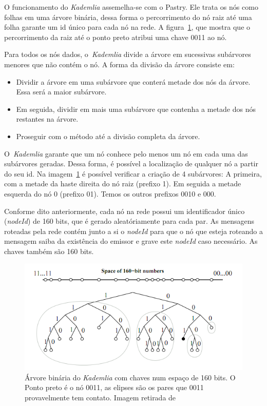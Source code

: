 O funcionamento do \emph{Kademlia} assemelha-se com o Pastry. Ele trata os nós como folhas em uma árvore binária, dessa forma o percorrimento do nó raiz até uma folha garante um id único para cada nó na rede. A figura~\ref{fig:arvore-kademlia}, que mostra que o percorrimento da raiz até o ponto preto atribui uma chave 0011 ao nó.

Para todos os nós dados, o~\emph{Kademlia} divide a árvore em sucessivas subárvores menores que não contém o nó. A forma da divisão da árvore consiste em:
\begin{itemize}
	\item Dividir a árvore em uma subárvore que conterá metade dos nós da árvore. Essa será a maior subárvore.
	\item Em seguida, dividir em mais uma subárvore que contenha a metade dos nós restantes na árvore.
	\item Proseguir com o método até a divisão completa da árvore.
\end{itemize}
O~\emph{Kademlia} garante que um nó conhece pelo menos um nó em cada uma das subárvores geradas. Dessa forma, é possível a localização de qualquer nó a partir do seu id. Na imagem~\ref{fig:arvore-kademlia} é possível verificar a criação de 4 subárvores: A primeira, com a metade da haste direita do nó raiz (prefixo 1). Em seguida a metade esquerda do nó 0 (prefixo 01). Temos os outros prefixos 0010 e 000.

Conforme dito anteriormente, cada nó na rede possui um identificador único (\emph{nodeId}) de 160 bits, que é gerado aleatóriamente para cada par. As mensagens roteadas pela rede contém junto a si o \emph{nodeId} para que o nó que esteja roteando a mensagem saiba da existência do emissor e grave este \emph{nodeId} caso necessário. As chaves também são 160 bits.

\begin{figure}
	\centering
	\includegraphics[scale=0.5]{images/arvore-kademlia.png}
	\caption{Árvore binária do \emph{Kademlia} com chaves num espaço de 160 bits. O Ponto preto é o nó 0011, as elipses são os pares que 0011 provavelmente tem contato. Imagem retirada de~\cite{welzi11}}
	\label{fig:arvore-kademlia}
\end{figure}

